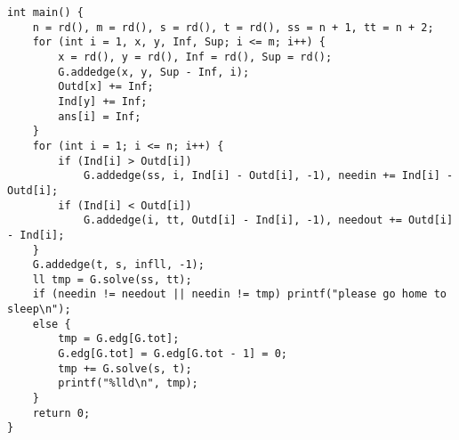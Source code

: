 \begin{verbatim}
int main() {
    n = rd(), m = rd(), s = rd(), t = rd(), ss = n + 1, tt = n + 2;
    for (int i = 1, x, y, Inf, Sup; i <= m; i++) {
        x = rd(), y = rd(), Inf = rd(), Sup = rd();
        G.addedge(x, y, Sup - Inf, i);
        Outd[x] += Inf;
        Ind[y] += Inf;
        ans[i] = Inf;
    }
    for (int i = 1; i <= n; i++) {
        if (Ind[i] > Outd[i])
            G.addedge(ss, i, Ind[i] - Outd[i], -1), needin += Ind[i] - Outd[i];
        if (Ind[i] < Outd[i])
            G.addedge(i, tt, Outd[i] - Ind[i], -1), needout += Outd[i] - Ind[i];
    }
    G.addedge(t, s, infll, -1);
    ll tmp = G.solve(ss, tt);
    if (needin != needout || needin != tmp) printf("please go home to sleep\n");
    else {
        tmp = G.edg[G.tot];
        G.edg[G.tot] = G.edg[G.tot - 1] = 0;
        tmp += G.solve(s, t);
        printf("%lld\n", tmp);
    }
    return 0;
}
\end{verbatim}
